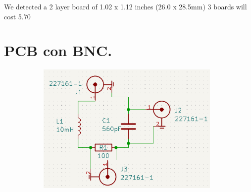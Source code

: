 \begin{figure}[!ht]
\begin{minipage}[c]{0.49\textwidth}
\begin{subfigure}{\textwidth}
					\captionsetup{width=0.8\textwidth}
					\subcaption{}
				\end{subfigure}
		\end{minipage}
	\caption{}
	\label{fig:}
\end{figure}



We detected a 2 layer board of 1.02 x 1.12 inches (26.0 x 28.5mm)
3 boards will cost 5.70 %


\section{PCB con BNC.}
\begin{figure}[!ht]
	\begin{minipage}[c]{0.3325\textwidth}
		\begin{subfigure}{\textwidth}
			\centering
			\includegraphics[width=0.978\textwidth]{Figures/02_06_2025/Schematic_BNC}
			\captionsetup{width=0.8\textwidth}
			\subcaption{}
		\end{subfigure}
	\end{minipage}\begin{minipage}[c]{0.332149\textwidth}
		\begin{subfigure}{\textwidth}
			\centering

\end{subfigure}
\end{minipage}
\end{figure}
